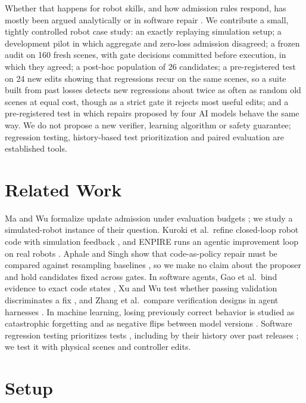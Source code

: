 \documentclass[letterpaper]{article} %
\begin{document}
Whether that happens for robot skills, and how admission rules respond, has mostly been argued analytically or in software repair \citep{ma2026validation,gao2026looping}. We contribute a small, tightly controlled robot case study: an exactly replaying simulation setup; a development pilot in which aggregate and zero-loss admission disagreed; a frozen audit on 160 fresh scenes, with gate decisions committed before execution, in which they agreed; a post-hoc population of 26 candidates; a pre-registered test on 24 new edits showing that regressions recur on the same scenes, so a suite built from past losses detects new regressions about twice as often as random old scenes at equal cost, though as a strict gate it rejects most useful edits; and a pre-registered test in which repairs proposed by four AI models behave the same way. We do not propose a new verifier, learning algorithm or safety guarantee; regression testing, history-based test prioritization and paired evaluation are established tools.

\section{Related Work}
Ma and Wu formalize update admission under evaluation budgets \citep{ma2026validation}; we study a simulated-robot instance of their question. Kuroki et al.\ refine closed-loop robot code with simulation feedback \citep{kuroki2026closedloop}, and ENPIRE runs an agentic improvement loop on real robots \citep{xiao2026enpire}. Aphale and Singh show that code-as-policy repair must be compared against resampling baselines \citep{aphale2026selfrepair}, so we make no claim about the proposer and hold candidates fixed across gates. In software agents, Gao et al.\ bind evidence to exact code states \citep{gao2026looping}, Xu and Wu test whether passing validation discriminates a fix \citep{xu2026evidence}, and Zhang et al.\ compare verification designs in agent harnesses \citep{zhang2026verification}. In machine learning, losing previously correct behavior is studied as catastrophic forgetting \citep{kirkpatrick2017forgetting} and as negative flips between model versions \citep{yan2021pct}. Software regression testing prioritizes tests \citep{elbaum2002prioritization}, including by their history over past releases \citep{kim2002history}; we test it with physical scenes and controller edits.

\section{Setup}
\end{document}
